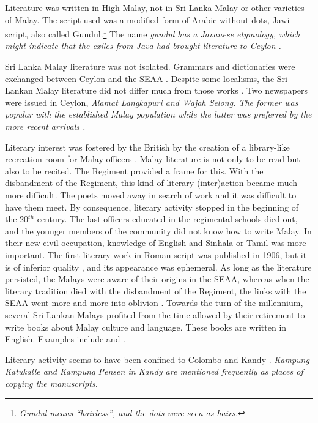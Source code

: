 Literature was written in High Malay, not in Sri Lanka Malay or other varieties of Malay. The script used was a modified form of Arabic without dots, Jawi script, also called Gundul.\footnote{\em Gundul \em means ``hairless'', and the dots were seen as hairs.} The name \em gundul \em has a Javanese etymology, which might indicate that the exiles from Java had brought literature to Ceylon \citep[134ff]{Hussainmiya1990}.

Sri Lanka Malay literature was not isolated. Grammars and dictionaries were exchanged between Ceylon and the SEAA \citep[145]{Hussainmiya1990}. Despite some localisms, the Sri Lankan Malay literature did not differ much from those works \citep[149]{Hussainmiya1990}.
Two newspapers were issued in Ceylon, \em Alamat Langkapuri \em and  \em Wajah Selong\em. The former was popular with the established Malay population while the latter was preferred by the more recent arrivals \citep[156]{Hussainmiya1990}.

Literary interest was fostered by the British by the creation of a library-like recreation room for Malay officers \citep[146]{Hussainmiya1990}. Malay literature is not only to be read but also to be recited. The Regiment provided a frame for this. With the disbandment of the Regiment, this kind of literary (inter)action became much  more difficult. The poets moved away in search of work and it was difficult to have them meet. By consequence, literary activity stopped in the beginning of the 20$^{th}$ century. The last officers educated in the regimental schools died out, and the younger members of the community did not know how to write Malay. In their new civil occupation, knowledge of English and Sinhala or Tamil was more important. The first literary work in Roman script was published in 1906, but it is of inferior quality  \citep[149]{Hussainmiya1990}, and its appearance was ephemeral. As long as the literature persisted, the Malays were aware of their origins in the SEAA, whereas when the literary tradition died with the disbandment of the Regiment, the links with the SEAA went more and more into oblivion \citep[13f]{Hussainmiya1987}. Towards the turn of the millennium, several Sri Lankan Malays  profited from the time allowed by their retirement to write books about Malay culture and language. These books are written in English. Examples include \citet{Saldin2001,Saldin2003} and \citet{Thaliph2005}.

Literary activity seems to have been confined to Colombo and Kandy \citep[146]{Hussainmiya1990}.  \em Kampung Katukalle \em and \em Kampung Pensen \em in Kandy are mentioned frequently as places of copying the manuscripts.


